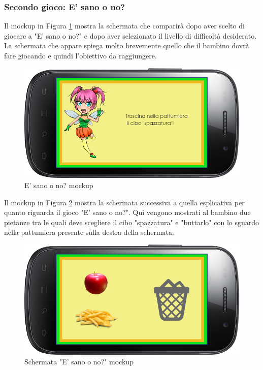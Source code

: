 \subsubsection{Secondo gioco: E' sano o no?}
Il mockup in Figura \ref{fig:E' sano o no?} mostra la schermata che comparirà dopo aver scelto di giocare a "E' sano o no?" e dopo aver selezionato il livello di difficoltà desiderato. La schermata che appare spiega molto brevemente quello che il bambino dovrà fare giocando e quindi l'obiettivo da raggiungere.
\vspace{70pt}
\begin{figure}[htbp]
\centering
\includegraphics[width=\textwidth]{Images/Mockup/gioco2}
\caption{E' sano o no? mockup}
\label{fig:E' sano o no?}
\end{figure}
\clearpage

Il mockup in Figura \ref{fig:Schermata "E' sano o no?"} mostra la schermata successiva a quella esplicativa per quanto riguarda il gioco "E' sano o no?". Qui vengono mostrati al bambino due pietanze tra le quali deve scegliere il cibo "spazzatura" e "buttarlo" con lo sguardo nella pattumiera presente sulla destra della schermata.
\vspace{70pt}
\begin{figure}[htbp]
\centering
\includegraphics[width=\textwidth]{Images/Mockup/sano}
\caption{Schermata "E' sano o no?" mockup}
\label{fig:Schermata "E' sano o no?"}
\end{figure}
\clearpage

